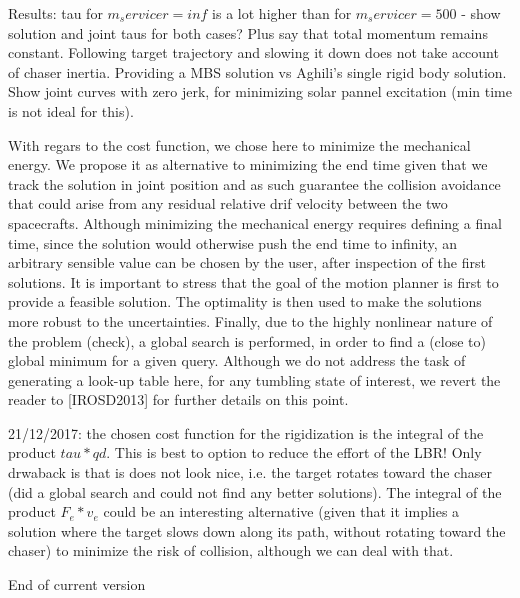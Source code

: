 Results: tau for $m_servicer = inf$ is a lot higher than for $m_servicer = 500$ - show solution and joint taus for both cases? Plus say that total momentum remains constant. Following target trajectory and slowing it down does not take account of chaser inertia. Providing a MBS solution vs Aghili's single rigid body solution. Show joint curves with zero jerk, for minimizing solar pannel excitation (min time is not ideal for this).


With regars to the cost function, we chose here to minimize the mechanical energy. We propose it as alternative to minimizing the end time given that we track the solution in joint position and as such guarantee the collision avoidance that could arise from any residual relative drif velocity between the two spacecrafts. Although minimizing the mechanical energy requires defining a final time, since the solution would otherwise push the end time to infinity, an arbitrary sensible value can be chosen by the user, after inspection of the first solutions. It is important to stress that the goal of the motion planner is first to provide a feasible solution. The optimality is then used to make the solutions more robust to the uncertainties. Finally, due to the highly nonlinear nature of the problem (check), a global search is performed, in order to find a (close to) global minimum for a given query. Although we do not address the task of generating a look-up table here, for any tumbling state of interest, we revert the reader to [IROSD2013] for further details on this point.

21/12/2017: the chosen cost function for the rigidization is the integral of the product $tau*qd$. This is best to option to reduce the effort of the LBR! Only drwaback is that is does not look nice, i.e. the target rotates toward the chaser (did a global search and could not find any better solutions). The integral of the product $F_e*v_e$ could be an interesting alternative (given that it implies a solution where the target slows down along its path, without rotating toward the chaser) to minimize the risk of collision, although we can deal with that.


End of current version


